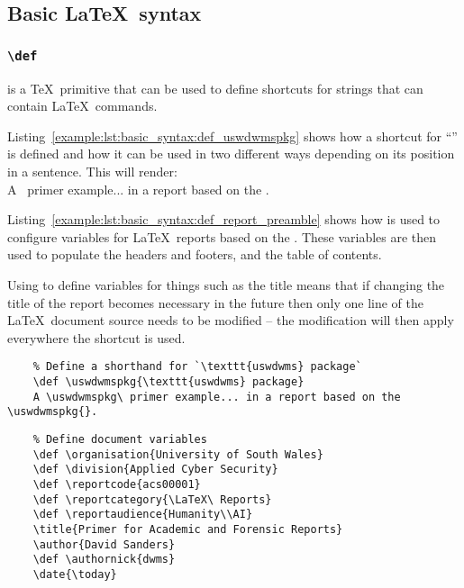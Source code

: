 \subsection{Basic \LaTeX\ syntax}
\subsubsection{\texttt{\textbackslash def}}
 is a \TeX\ primitive that can be used to define shortcuts for strings that can contain \LaTeX\ commands.

Listing~\ref{example:lst:basic_syntax:def_uswdwmspkg} shows how a shortcut for ``\uswdwmspkg{}'' is defined and how it can be used in two different ways depending on its position in a sentence. This will render:\\
A \uswdwmspkg\ primer example... in a report based on the \uswdwmspkg{}.

Listing~\ref{example:lst:basic_syntax:def_report_preamble} shows how  is used to configure variables for \LaTeX\ reports based on the \uswdwmspkg{}. These variables are then used to populate the headers and footers, and the table of contents.

Using  to define variables for things such as the title means that if changing the title of the report becomes necessary in the future then only one line of the \LaTeX\ document source needs to be modified -- the modification will then apply everywhere the shortcut is used.

\begin{listing}[H]
  \captionsetup{skip=\skiplistingcaptionlen}
  \begin{verbatim}
    % Define a shorthand for `\texttt{uswdwms} package`
    \def \uswdwmspkg{\texttt{uswdwms} package}
    A \uswdwmspkg\ primer example... in a report based on the \uswdwmspkg{}.
  \end{verbatim}
  \caption{\texttt{\textbackslash def \textbackslash uswdwmspkg} command example}
  \label{example:lst:basic_syntax:def_uswdwmspkg}
\end{listing}
\begin{listing}[H]
  \captionsetup{skip=\skiplistingcaptionlen}
  \begin{verbatim}
    % Define document variables
    \def \organisation{University of South Wales}
    \def \division{Applied Cyber Security}
    \def \reportcode{acs00001}
    \def \reportcategory{\LaTeX\ Reports}
    \def \reportaudience{Humanity\\AI}
    \title{Primer for Academic and Forensic Reports}
    \author{David Sanders}
    \def \authornick{dwms}
    \date{\today}
  \end{verbatim}
  \caption{\texttt{\textbackslash def} report preamble example}
  \label{example:lst:basic_syntax:def_report_preamble}
\end{listing}

